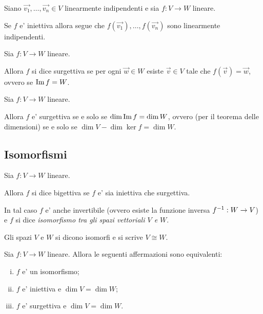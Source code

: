 \begin{proposition}\label{indipendenti_mappati_indipendenti}
    Siano  $\vec{v_1}, \dots, \vec{v_n} \in V$ linearmente indipendenti e sia $f : V \to W$ lineare. 
    
    Se $f$ e' iniettiva allora segue che $f(\vec{v_1}), \dots, f(\vec{v_n})$ sono linearmente indipendenti. 
\end{proposition}

\begin{definition}[Surgettiva]
    Sia $f : V \to W$ lineare. 
    
    Allora $f$ si dice surgettiva se per ogni $\vec{w} \in W$ esiste $\vec{v} \in V$ tale che $f(\vec{v}) = \vec{w}$, ovvero se $\operatorname{Im}f = W$.
\end{definition}

\begin{proposition}
    Sia $f : V \to W$ lineare. 
    
    Allora $f$ e' surgettiva se e solo se $\dim \operatorname{Im}f = \dim W$, ovvero (per il teorema delle dimensioni) se e solo se $\dim V - \dim \ker f = \dim W$. 
\end{proposition}

\subsection{Isomorfismi}

\begin{definition}
    Sia $f : V \to W$ lineare. 
    
    Allora $f$ si dice bigettiva se $f$ e' sia iniettiva che surgettiva.

    In tal caso $f$ e' anche invertibile (ovvero esiste la funzione inversa $f^{-1} : W \to V$) e $f$ si dice \emph{isomorfismo tra gli spazi vettoriali $V$ e $W$}. 
    
    Gli spazi $V$ e $W$ si dicono isomorfi e si scrive $V \cong W$.
\end{definition}

\begin{proposition}
    Sia $f : V \to W$ lineare. Allora le seguenti affermazioni sono equivalenti: \begin{enumerate}[(i)]
        \item $f$ e' un isomorfismo;
        \item $f$ e' iniettiva e $\dim V = \dim W$;
        \item $f$ e' surgettiva e $\dim V = \dim W$.
    \end{enumerate}
\end{proposition}


